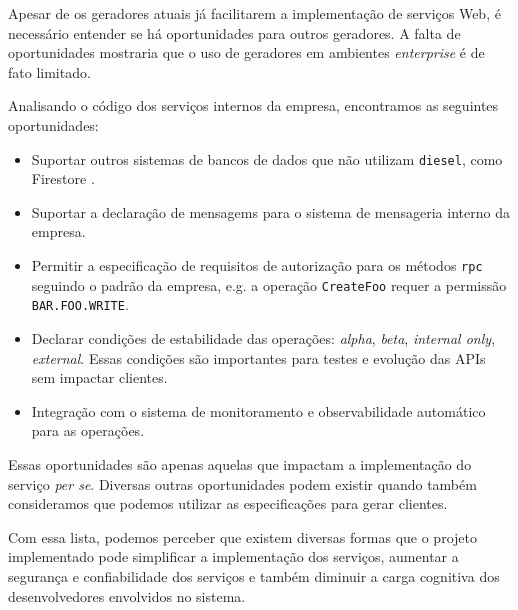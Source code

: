 Apesar de os geradores atuais já facilitarem a implementação de serviços Web, é necessário
entender se há oportunidades para outros geradores. A falta de oportunidades mostraria que
o uso de geradores em ambientes \textit{enterprise} é de fato limitado.

Analisando o código dos serviços internos da empresa, encontramos as seguintes oportunidades:

\begin{itemize}
\item Suportar outros sistemas de bancos de dados que não utilizam \texttt{diesel}, como
  Firestore \cite{google:megastore}.
\item Suportar a declaração de mensagems para o sistema de mensageria interno da empresa.
\item Permitir a especificação de requisitos de autorização para os métodos \texttt{rpc}
  seguindo o padrão da empresa, e.g. a operação \texttt{CreateFoo} requer a permissão
  \texttt{BAR.FOO.WRITE}.
\item Declarar condições de estabilidade das operações: \textit{alpha}, \textit{beta},
  \textit{internal only}, \textit{external}. Essas condições são importantes para testes
  e evolução das APIs sem impactar clientes.
\item Integração com o sistema de monitoramento e observabilidade automático para as operações.
\end{itemize}

Essas oportunidades são apenas aquelas que impactam a implementação do serviço \textit{per se}.
Diversas outras oportunidades podem existir quando também consideramos que podemos utilizar
as especificações para gerar clientes.

Com essa lista, podemos perceber que existem diversas formas que o projeto implementado pode
simplificar a implementação dos serviços, aumentar a segurança e confiabilidade dos serviços
e também diminuir a carga cognitiva dos desenvolvedores envolvidos no sistema.
